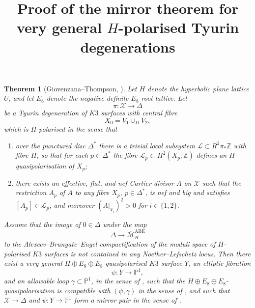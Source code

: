 \documentclass[11pt]{amsart}
\title{Proof of the mirror theorem for very general $H$-polarised Tyurin degenerations}
\author{}
\theoremstyle{plain}
\newtheorem{theorem}{Theorem}
\theoremstyle{remark}
\newcommand{\cL}{\mathcal{L}}
\newcommand{\cX}{\mathcal{X}}
\newcommand{\cM}{\mathcal{M}}
\newcommand{\bbP}{\mathbb{P}}
\newcommand{\bbZ}{\mathbb{Z}}
\begin{document}
\maketitle

\begin{theorem}[Giovenzana--Thompson, \cite{dfk3slpms}]
Let \(H\) denote the hyperbolic plane lattice \(U\), and let \(E_8\) denote the negative definite \(E_8\) root lattice. Let
\[
\pi\colon \cX \longrightarrow \Delta
\]
be a Tyurin degeneration of \(K3\) surfaces with central fibre
\[
X_0=V_1\cup_D V_2,
\]
which is \(H\)-polarised in the sense that
\begin{enumerate}
\item[(1)] over the punctured disc \(\Delta^*\) there is a trivial local subsystem
\(\cL\subset R^2\pi_*\bbZ\) with fibre \(H\), so that for each \(p\in\Delta^*\)
the fibre \(\cL_p\subset H^2(X_p;\bbZ)\) defines an \(H\)-quasipolarisation
of \(X_p\);
\item[(2)] there exists an effective, flat, and nef Cartier divisor \(A\) on \(\cX\)
such that the restriction \(A_p\) of \(A\) to any fibre \(X_p\), \(p\in\Delta^*\),
is nef and big and satisfies \([A_p]\in\cL_p\), and moreover
\((A|_{V_i})^2>0\) for \(i\in\{1,2\}\).
\end{enumerate}
Assume that the image of \(0\in\Delta\) under the map
\[
\Delta \longrightarrow \overline{\cM}_H^{\mathrm{ABE}}
\]
to the Alexeev--Brunyate--Engel compactification of the moduli space of
\(H\)-polarised \(K3\) surfaces is not contained in any Noether--Lefschetz
locus. Then there exist a very general
\(H\oplus E_8\oplus E_8\)-quasipolarised \(K3\) surface \(Y\), an elliptic
fibration
\[
\psi\colon Y\longrightarrow \bbP^1,
\]
and an allowable loop \(\gamma\subset\bbP^1\), in the sense of
\cite[Definition~4.11]{dfk3slpms}, such that the
\(H\oplus E_8\oplus E_8\)-quasipolarisation is compatible with
\((\psi,\gamma)\) in the sense of \cite[Definition~4.21]{dfk3slpms}, and such
that \(\cX\to\Delta\) and \(\psi\colon Y\to\bbP^1\) form a mirror pair in the
sense of \cite[Definition~5.1]{dfk3slpms}.
\end{theorem}
\end{document}
